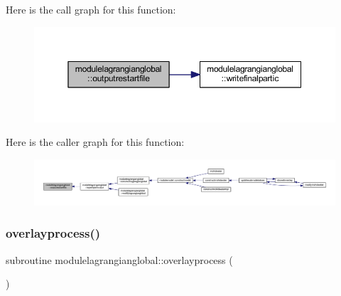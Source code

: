 Here is the call graph for this function\+:\nopagebreak
\begin{figure}[H]
\begin{center}
\leavevmode
\includegraphics[width=350pt]{namespacemodulelagrangianglobal_a9eaa20c6b0f8ebb9961c4eb75eaffb59_cgraph}
\end{center}
\end{figure}
Here is the caller graph for this function\+:\nopagebreak
\begin{figure}[H]
\begin{center}
\leavevmode
\includegraphics[width=350pt]{namespacemodulelagrangianglobal_a9eaa20c6b0f8ebb9961c4eb75eaffb59_icgraph}
\end{center}
\end{figure}
\mbox{\label{namespacemodulelagrangianglobal_ac6d604733d4fe67d94733e7f0e9d8a12}} 
\subsubsection{\texorpdfstring{overlayprocess()}{overlayprocess()}}
{\footnotesize\ttfamily subroutine modulelagrangianglobal\+::overlayprocess (\begin{DoxyParamCaption}{ }\end{DoxyParamCaption})\hspace{0.3cm}{\ttfamily [private]}}


